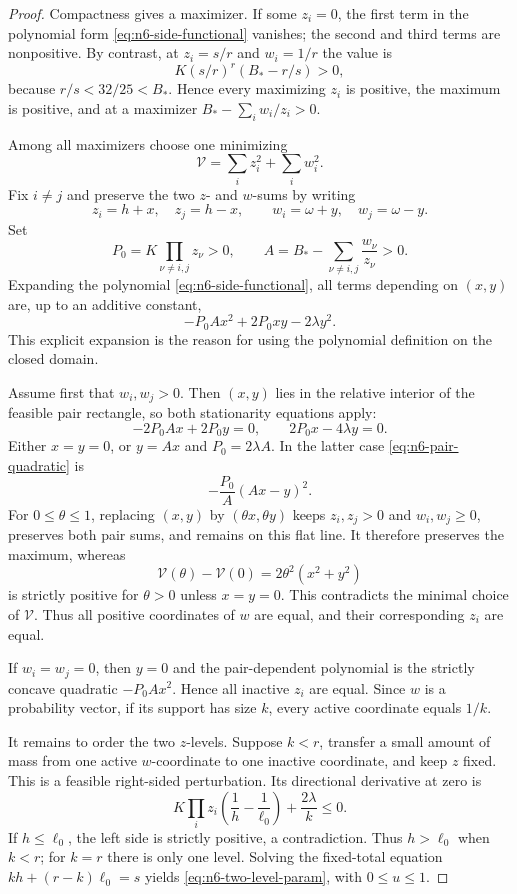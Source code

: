 \documentclass[11pt,a4paper]{article}
\numberwithin{equation}{section}
\theoremstyle{definition}
\newcommand{\1}{\mathbf{1}}
\begin{document}
\begin{proof}
Compactness gives a maximizer.  If some $z_i=0$, the first term in the
polynomial form \eqref{eq:n6-side-functional} vanishes; the second and third
terms are nonpositive.  By contrast, at
$z_i=s/r$ and $w_i=1/r$ the value is
\[
 K(s/r)^r(B_*-r/s)>0,
\]
because $r/s<32/25<B_*$.  Hence every maximizing $z_i$ is positive, the
maximum is positive, and at a maximizer
$B_*-\sum_iw_i/z_i>0$.

Among all maximizers choose one minimizing
\[
 \mathcal V=\sum_i z_i^2+\sum_iw_i^2.
\]
Fix $i\ne j$ and preserve the two $z$- and $w$-sums by writing
\[
 z_i=h+x,\quad z_j=h-x,
 \qquad
 w_i=\omega+y,\quad w_j=\omega-y.
\]
Set
\[
 P_0=K\prod_{\nu\ne i,j}z_\nu>0,
 \qquad
 A=B_*-\sum_{\nu\ne i,j}\frac{w_\nu}{z_\nu}>0.
\]
Expanding the polynomial \eqref{eq:n6-side-functional}, all terms depending
on $(x,y)$ are, up to an additive constant,
\begin{equation}\label{eq:n6-pair-quadratic}
 -P_0A x^2+2P_0xy-2\lambda y^2.
\end{equation}
This explicit expansion is the reason for using the polynomial definition
on the closed domain.

Assume first that $w_i,w_j>0$.  Then $(x,y)$ lies in the relative interior
of the feasible pair rectangle, so both stationarity equations apply:
\[
 -2P_0Ax+2P_0y=0,
 \qquad
 2P_0x-4\lambda y=0.
\]
Either $x=y=0$, or $y=Ax$ and $P_0=2\lambda A$.  In the latter case
\eqref{eq:n6-pair-quadratic} is
\[
 -\frac{P_0}{A}(Ax-y)^2.
\]
For $0\le\theta\le1$, replacing $(x,y)$ by $(\theta x,\theta y)$ keeps
$z_i,z_j>0$ and $w_i,w_j\ge0$, preserves both pair sums, and remains on this
flat line.  It therefore preserves the maximum, whereas
\[
 \mathcal V(\theta)-\mathcal V(0)
 =2\theta^2(x^2+y^2)
\]
is strictly positive for $\theta>0$ unless $x=y=0$.  This contradicts the
minimal choice of $\mathcal V$.  Thus all positive coordinates of $w$ are
equal, and their corresponding $z_i$ are equal.

If $w_i=w_j=0$, then $y=0$ and the pair-dependent polynomial is the strictly
concave quadratic $-P_0Ax^2$.  Hence all inactive $z_i$ are equal.  Since
$w$ is a probability vector, if its support has size $k$, every active
coordinate equals $1/k$.

It remains to order the two $z$-levels.  Suppose $k<r$, transfer a small
amount of mass from one active $w$-coordinate to one inactive coordinate,
and keep $z$ fixed.  This is a feasible right-sided perturbation.  Its
directional derivative at zero is
\[
 K\prod_i z_i\left(\frac1h-\frac1{\ell_0}\right)
 +\frac{2\lambda}{k}\le0.
\]
If $h\le\ell_0$, the left side is strictly positive, a contradiction.
Thus $h>\ell_0$ when $k<r$; for $k=r$ there is only one level.  Solving the
fixed-total equation $kh+(r-k)\ell_0=s$ yields
\eqref{eq:n6-two-level-param}, with $0\le u\le1$.
\end{proof}
\end{document}
